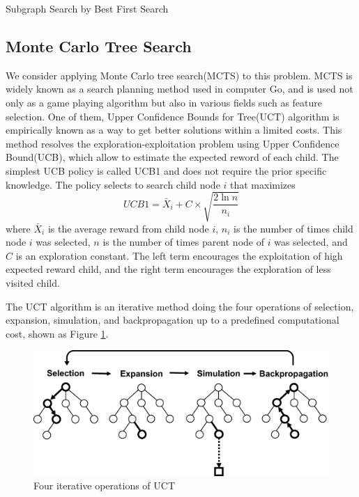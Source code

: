 \begin{algorithm2e}[H]
  \caption{Subgraph Search by Best First Search}
  \label{alg:bfs}
\end{algorithm2e}

\subsection{Monte Carlo Tree Search}
We consider applying Monte Carlo tree search(MCTS) 
\cite{Levente:2006, Romaric:2010, Cameron:2012} to this problem. 
MCTS is widely known as a search planning method used in computer Go, 
and is used not only as a game playing algorithm but also in various fields such as feature selection. 
One of them, Upper Confidence Bounds for Tree(UCT) algorithm 
\cite{Levente:2006} is empirically known as a way to get better solutions within a limited costs.
This method resolves the exploration-exploitation problem using Upper Confidence Bound(UCB),
which allow to estimate the expected reword of each child.
The simplest UCB policy is called UCB1 and does not require the prior specific knowledge.
The policy selects to search child node $i$ that maximizes
\begin{equation}
  \label{eq:ucb}
  UCB1 = \bar{X}_{i} + C \times \sqrt{\frac{2\ln{n}}{n_{i}}}
\end{equation}
where $\bar{X}_{i}$ is the average reward from child node $i$, 
$n_{i}$ is the number of times child node $i$ was selected, 
$n$ is the number of times parent node of $i$ was selected,
and $C$ is an exploration constant.
The left term encourages the exploitation of high expected reward child,
and the right term encourages the exploration of less visited child.

The UCT algorithm is an iterative method 
doing the four operations of selection, expansion, 
simulation, and backpropagation up to a predefined computational cost, shown as Figure \ref{fig:MCTS}.
\begin{figure}[t]
  \centering
  \includegraphics[width=0.9\linewidth]{img/MCTS.eps}
  \caption{Four iterative operations of UCT}
  \label{fig:MCTS}
\end{figure}


